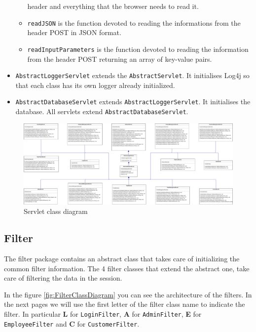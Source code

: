 \begin{itemize}
\begin{itemize}
        header and everything that the browser needs to read it.
        \item \texttt{readJSON}  is the function devoted to reading the informations 
        from the header POST in JSON format.
        \item \texttt{readInputParameters} is the function devoted to reading the 
        information from the header POST returning an array of key-value pairs.
    \end{itemize}
    \item \texttt{AbstractLoggerServlet} extends the \texttt{AbstractServlet}. It initialises Log4j
    so that each class has its own logger already initialized.
    \item \texttt{AbstractDatabaseServlet} extends \texttt{AbstractLoggerServlet}. It initialises the database.
    All servlets extend \texttt{AbstractDatabaseServlet}.
\end{itemize}    


\begin{figure}[H]
    \includegraphics[width=\textwidth,height=\textheight,keepaspectratio]{Schemas/servlet.drawio.pdf}
    \caption{Servlet class diagram}
    \label{fig:ServletClassDiagram}
\end{figure}

\subsection*{Filter}

    
The filter package contains an abstract class that takes care of 
initializing the common filter information. The 4 filter classes that 
extend the abstract one, take care of filtering the data in the session.

In the figure \ref{fig:FilterClassDiagram} you can see the architecture 
of the filters. In the next pages we will use
the first letter of the filter class name to indicate the filter.
In particular \textbf{L} for \texttt{LoginFilter}, 
\textbf{A} for \texttt{AdminFilter}, \textbf{E} for 
\texttt{EmployeeFilter} and \textbf{C} for \texttt{CustomerFilter}.


